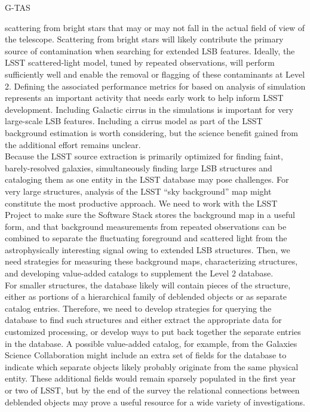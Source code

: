 {\begin{tasklist}{G-TAS}
\begin{task}
{scattering from bright stars that may or may not fall in the actual field of
view of the telescope. Scattering from bright stars will likely contribute the
primary source of contamination when searching for extended LSB features.
Ideally, the LSST scattered-light model,
tuned by repeated observations, will perform sufficiently well and enable the removal
or flagging of these contaminants at Level 2.  
Defining the associated performance metrics for
based on analysis of simulation represents an important activity that needs early work to 
help inform LSST development. Including Galactic cirrus in the simulations is important
for very large-scale LSB features. Including a cirrus model as part of the LSST background
estimation is worth considering, but the science benefit gained from the
additional effort remains unclear.\\
Because the LSST source extraction is primarily
optimized for finding faint, barely-resolved galaxies,
simultaneously finding large LSB structures and cataloging them as 
one entity in the LSST database may pose challenges. 
For very large structures, analysis of the LSST ``sky background''
map might constitute the most productive approach. 
We need to work with the LSST Project
to make sure the Software Stack stores the background map in a useful form, and that background
measurements from repeated observations can be combined to separate the fluctuating
foreground and scattered light from the astrophysically interesting signal owing to extended
LSB structures.
Then, we need strategies for measuring these background maps, characterizing
structures, and developing value-added catalogs to supplement the Level 2 database.\\
For smaller structures, the database likely will contain pieces 
of the structure, either as portions of a hierarchical
family of deblended objects or as separate catalog entries. Therefore, we need to 
develop strategies for querying the database to find such structures and either extract
the appropriate data for customized processing, or develop ways to put back together
the separate entries in the database. A possible value-added catalog, for example, from
the Galaxies Science Collaboration might include an extra set of fields for the database to indicate 
which separate objects likely probably originate from the same physical entity. These additional fields would
remain sparsely populated in the first year or two of LSST, but by the end of the survey 
the relational connections between deblended objects may prove a 
useful resource for a wide variety of investigations.
}
\end{task}
\end{tasklist}}
